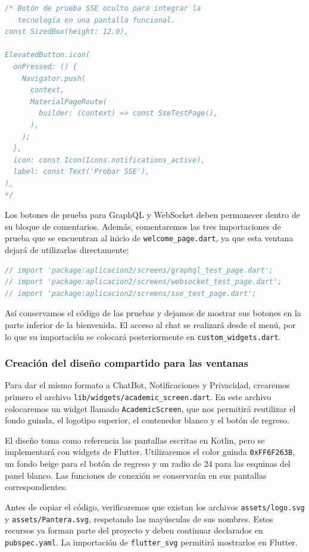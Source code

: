 \begin{lstlisting}[language=Java, caption={Botón temporal de SSE comentado}]
/* Botón de prueba SSE oculto para integrar la
   tecnología en una pantalla funcional.
const SizedBox(height: 12.0),

ElevatedButton.icon(
  onPressed: () {
    Navigator.push(
      context,
      MaterialPageRoute(
        builder: (context) => const SseTestPage(),
      ),
    );
  },
  icon: const Icon(Icons.notifications_active),
  label: const Text('Probar SSE'),
),
*/
\end{lstlisting}

Los botones de prueba para GraphQL y WebSocket deben permanecer dentro de su bloque de comentarios. Además, comentaremos las tres importaciones de prueba que se encuentran al inicio de \texttt{welcome\_page.dart}, ya que esta ventana dejará de utilizarlas directamente:

\begin{lstlisting}[language=Java, caption={Importaciones de prueba comentadas}]
// import 'package:aplicacion2/screens/graphql_test_page.dart';
// import 'package:aplicacion2/screens/websocket_test_page.dart';
// import 'package:aplicacion2/screens/sse_test_page.dart';
\end{lstlisting}

Así conservamos el código de las pruebas y dejamos de mostrar sus botones en la parte inferior de la bienvenida. El acceso al chat se realizará desde el menú, por lo que su importación se colocará posteriormente en \texttt{custom\_widgets.dart}.

\subsubsection{Creación del diseño compartido para las ventanas}
Para dar el mismo formato a ChatBot, Notificaciones y Privacidad, crearemos primero el archivo \texttt{lib/widgets/academic\_screen.dart}. En este archivo colocaremos un widget llamado \texttt{AcademicScreen}, que nos permitirá reutilizar el fondo guinda, el logotipo superior, el contenedor blanco y el botón de regreso.

El diseño toma como referencia las pantallas escritas en Kotlin, pero se implementará con widgets de Flutter. Utilizaremos el color guinda \texttt{0xFF6F263B}, un fondo beige para el botón de regreso y un radio de 24 para las esquinas del panel blanco. Las funciones de conexión se conservarán en sus pantallas correspondientes.

Antes de copiar el código, verificaremos que existan los archivos \texttt{assets/logo.svg} y \texttt{assets/Pantera.svg}, respetando las mayúsculas de sus nombres. Estos recursos ya forman parte del proyecto y deben continuar declarados en \texttt{pubspec.yaml}. La importación de \texttt{flutter\_svg} permitirá mostrarlos en Flutter.


